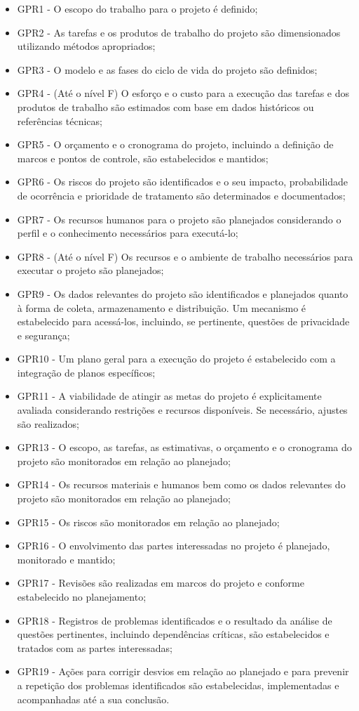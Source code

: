 \documentclass{acm_proc_article-sp}
\begin{document}
\begin{itemize}
\item GPR1 - O escopo do trabalho para o projeto é definido;
\item GPR2 - As tarefas e os produtos de trabalho do projeto são dimensionados utilizando métodos apropriados;
\item GPR3 - O modelo e as fases do ciclo de vida do projeto são definidos;
\item GPR4 - (Até o nível F) O esforço e o custo para a execução das tarefas e dos produtos de trabalho são estimados com base em dados históricos ou referências técnicas;
\item GPR5 - O orçamento e o cronograma do projeto, incluindo a definição de marcos e pontos de controle, são estabelecidos e mantidos; 
\item GPR6 - Os riscos do projeto são identificados e o seu impacto, probabilidade de ocorrência e prioridade de tratamento são determinados e documentados;
\item GPR7 - Os recursos humanos para o projeto são planejados considerando o perfil e o conhecimento necessários para executá-lo;
\item GPR8 - (Até o nível F) Os recursos e o ambiente de trabalho necessários para executar o projeto são planejados;
\item GPR9 - Os dados relevantes do projeto são identificados e planejados quanto à forma de coleta, armazenamento e distribuição. Um mecanismo é estabelecido para acessá-los, incluindo, se pertinente, questões de privacidade e segurança;
\item GPR10 - Um plano geral para a execução do projeto é estabelecido com a integração de planos específicos;
\item GPR11 - A viabilidade de atingir as metas do projeto é explicitamente avaliada considerando restrições e recursos disponíveis. Se necessário, ajustes são realizados;
\item GPR13 - O escopo, as tarefas, as estimativas, o orçamento e o cronograma do projeto são monitorados em relação ao planejado;
\item GPR14 - Os recursos materiais e humanos bem como os dados relevantes do projeto são monitorados em relação ao planejado;
\item GPR15 - Os riscos são monitorados em relação ao planejado;
\item GPR16 - O envolvimento das partes interessadas no projeto é planejado, monitorado e mantido;
\item GPR17 - Revisões são realizadas em marcos do projeto e conforme estabelecido no planejamento;
\item GPR18 - Registros de problemas identificados e o resultado da análise de questões pertinentes, incluindo dependências críticas, são estabelecidos e tratados com as partes interessadas;
\item GPR19 - Ações para corrigir desvios em relação ao planejado e para prevenir a repetição dos problemas identificados são estabelecidas, implementadas e acompanhadas até a sua conclusão.
\end{itemize}
\end{document}
